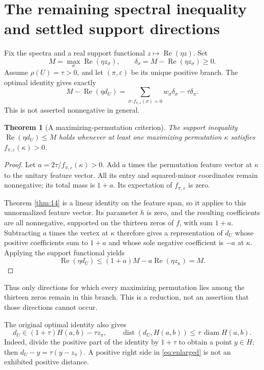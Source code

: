 \documentclass[11pt,a4paper]{article}
\newtheorem{theorem}{Theorem}[section]
\newcommand{\Rea}{\operatorname{Re}}
\newcommand{\dist}{\operatorname{dist}}
\newcommand{\eps}{\varepsilon}
\begin{document}
\section{The remaining spectral inequality and settled support directions}
Fix the spectra and a real support functional $z\mapsto\Rea(\eta z)$. Set
\[
M=\max_\sigma\Rea(\eta z_\sigma),\qquad
\delta_\sigma=M-\Rea(\eta z_\sigma)\ge0.
\]
Assume $\rho(U)=\tau>0$, and let $(\pi,\eps)$ be its unique positive branch. The optimal identity gives exactly
\begin{equation}\label{eq:remaining}
M-\Rea(\eta d_U)=
\sum_{\sigma:f_{\pi,\eps}(\sigma)=0}w_\sigma\delta_\sigma-\tau\delta_\pi.
\end{equation}
This is not asserted nonnegative in general.

\begin{theorem}[A maximizing-permutation criterion]\label{thm:safe}
The support inequality $\Rea(\eta d_U)\le M$ holds whenever at least one maximizing permutation $\kappa$ satisfies $f_{\pi,\eps}(\kappa)>0$.
\end{theorem}
\begin{proof}
Let $a=2\tau/f_{\pi,\eps}(\kappa)>0$. Add $a$ times the permutation feature vector at $\kappa$ to the unitary feature vector. All its entry and squared-minor coordinates remain nonnegative; its total mass is $1+a$. Its expectation of $f_{\pi,\eps}$ is zero.

Theorem \ref{thm:14} is a linear identity on the feature span, so it applies to this unnormalized feature vector. Its parameter $h$ is zero, and the resulting coefficients are all nonnegative, supported on the thirteen zeros of $f$, with sum $1+a$. Subtracting $a$ times the vertex at $\kappa$ therefore gives a representation of $d_U$ whose positive coefficients sum to $1+a$ and whose sole negative coefficient is $-a$ at $\kappa$. Applying the support functional yields
\[
\Rea(\eta d_U)\le(1+a)M-a\Rea(\eta z_\kappa)=M.
\]
\end{proof}
Thus only directions for which every maximizing permutation lies among the thirteen zeros remain in this branch. This is a reduction, not an assertion that those directions cannot occur.

The original optimal identity also gives
\begin{equation}\label{eq:enlarged}
d_U\in(1+\tau)H(a,b)-\tau z_\pi,\qquad
\dist(d_U,H(a,b))\le\tau\,\operatorname{diam}H(a,b).
\end{equation}
Indeed, divide the positive part of the identity by $1+\tau$ to obtain a point $y\in H$; then $d_U-y=\tau(y-z_\pi)$. A positive right side in \eqref{eq:enlarged} is not an exhibited positive distance.
\end{document}
